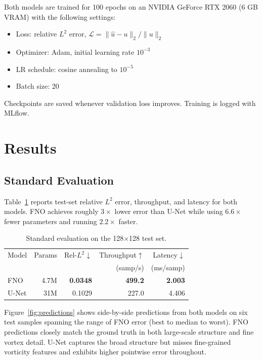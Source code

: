 \documentclass[sigconf,nonacm]{acmart}
\begin{document}
Both models are trained for 100 epochs on an NVIDIA GeForce RTX 2060 (6 GB
VRAM) with the following settings:
\begin{itemize}
  \item Loss: relative $L^2$ error,
        $\mathcal{L} = \|\hat{u} - u\|_2 / \|u\|_2$
  \item Optimizer: Adam, initial learning rate $10^{-3}$
  \item LR schedule: cosine annealing to $10^{-5}$
  \item Batch size: 20
\end{itemize}
Checkpoints are saved whenever validation loss improves.
Training is logged with MLflow.

\section{Results}
\label{sec:results}

\subsection{Standard Evaluation}

Table~\ref{tab:standard} reports test-set relative $L^2$ error, throughput, and
latency for both models.
FNO achieves roughly $3\times$ lower error than U-Net while using $6.6\times$
fewer parameters and running $2.2\times$ faster.

\begin{table}[t]
  \centering
  \caption{Standard evaluation on the 128$\times$128 test set.}
  \label{tab:standard}
  \begin{tabular}{lrrrr}
    \toprule
    Model  & Params & Rel-$L^2$$\downarrow$ & Throughput$\uparrow$ & Latency$\downarrow$ \\
           &        &                        & (samp/s)              & (ms/samp) \\
    \midrule
    FNO    & 4.7M   & \textbf{0.0348}        & \textbf{499.2}        & \textbf{2.003} \\
    U-Net  & 31M    & 0.1029                 & 227.0                 & 4.406 \\
    \bottomrule
  \end{tabular}
\end{table}

Figure~\ref{fig:predictions} shows side-by-side predictions from both models
on six test samples spanning the range of FNO error (best to median to worst).
FNO predictions closely match the ground truth in both large-scale structure and
fine vortex detail.
U-Net captures the broad structure but misses fine-grained vorticity features
and exhibits higher pointwise error throughout.
\end{document}
